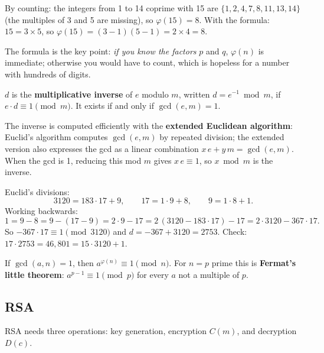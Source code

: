 \begin{example}[$\varphi(15)$]
By counting: the integers from 1 to 14 coprime with 15 are $\{1, 2, 4, 7, 8, 11, 13, 14\}$ (the multiples of 3 and 5 are missing), so $\varphi(15)=8$. With the formula: $15 = 3 \times 5$, so $\varphi(15) = (3-1)(5-1) = 2 \times 4 = 8$.
\end{example}

The formula is the key point: \emph{if you know the factors} $p$ and $q$, $\varphi(n)$ is immediate; otherwise you would have to count, which is hopeless for a number with hundreds of digits.

\begin{definition}
$d$ is the \textbf{multiplicative inverse} of $e$ modulo $m$, written $d = e^{-1} \bmod m$, if $e \cdot d \equiv 1 \pmod m$. It exists if and only if $\gcd(e,m)=1$.
\end{definition}

The inverse is computed efficiently with the \textbf{extended Euclidean algorithm}: Euclid's algorithm computes $\gcd(e,m)$ by repeated division; the extended version also expresses the gcd as a linear combination $x\,e + y\,m = \gcd(e,m)$. When the gcd is 1, reducing this mod $m$ gives $x\,e \equiv 1$, so $x \bmod m$ is the inverse.

\begin{example}
Euclid's divisions:
\[
3120 = 183 \cdot 17 + 9, \qquad 17 = 1 \cdot 9 + 8, \qquad 9 = 1 \cdot 8 + 1.
\]
Working backwards:
\[
1 = 9 - 8 = 9 - (17 - 9) = 2 \cdot 9 - 17 = 2\,(3120 - 183 \cdot 17) - 17 = 2 \cdot 3120 - 367 \cdot 17.
\]
So $-367 \cdot 17 \equiv 1 \pmod{3120}$ and $d = -367 + 3120 = 2753$. Check: $17 \cdot 2753 = 46{,}801 = 15 \cdot 3120 + 1$.
\end{example}

\begin{theorem}[Euler]
If $\gcd(a,n)=1$, then $a^{\varphi(n)} \equiv 1 \pmod n$. For $n=p$ prime this is \textbf{Fermat's little theorem}: $a^{p-1} \equiv 1 \pmod p$ for every $a$ not a multiple of $p$.
\end{theorem}

\subsection{RSA}

RSA needs three operations: key generation, encryption $C(m)$, and decryption $D(c)$.

